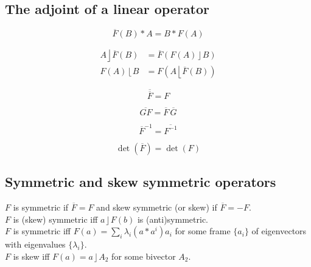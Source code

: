 \documentclass{utarticle}
\DeclareMathOperator{\lin}{\rfloor}
\DeclareMathOperator{\rin}{\lfloor}
\newcommand{\scprod}[2]{\ensuremath{#1 * #2}}
\newcommand{\adj}[1]{\ensuremath{\overline{#1}}}
\newcommand{\doubleadj}[1]{\ensuremath{\overline{\overline{#1}}}}
\begin{document}
\subsection{The adjoint of a linear operator}
\label{app:adj}

\begin{equation} \scprod{\adj{F}(B)}{A} = \scprod{B}{F(A)} \end{equation}

\begin{align}
A \lin \adj{F}(B) & = \adj{F}\left(F(A) \lin B\right) \nonumber \\
F(A) \rin B & = F\left(A \rin \adj{F}(B) \right)
\end{align}
 
\begin{equation} \doubleadj{F} = F \end{equation}

\begin{equation} \adj{GF} = \adj{F}\,\adj{G} \end{equation}  

\begin{equation} \adj{F}^{-1} = \adj{F^{-1}} \end{equation}

\begin{equation} \det(\adj{F}) = \det(F) \end{equation}

\subsection{Symmetric and skew symmetric operators}
\label{app:symmskew}

$F$ is symmetric if $\adj{F} = F$ and skew symmetric (or skew) if $\adj{F} = -F$. \\

\noindent $F$ is (skew) symmetric iff $a \lin F(b)$ is (anti)symmetric. \\

\noindent $F$ is symmetric iff $F(a) = \sum_i \lambda_i (\scprod{a}{a^i}) a_i$ for some
frame $\{a_i\}$ of eigenvectors with eigenvalues $\{\lambda_i\}$. \\


\noindent $F$ is skew iff $F(a) = a \lin A_2$ for some bivector $A_2$.
\end{document}
